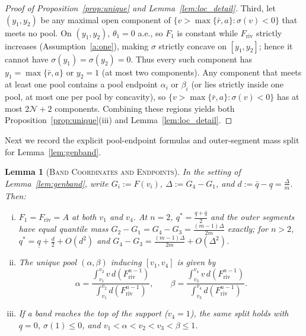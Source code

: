 \documentclass[12pt]{article}
\theoremstyle{mystyle}
\newtheorem{lemma}{Lemma}
\theoremstyle{mystyle2}
\newcommand{\1}{\mathbf{1}}
\begin{document}
\begin{proof}[Proof of Proposition~\ref{prop:unique} and Lemma~\ref{lem:loc_detail}]
Third, let $(y_1,y_2)$ be any maximal open component of $\{v>\max\{\bar r,a\}:\sigma(v)<0\}$ that meets no pool. On $(y_1,y_2)$, $\theta_1=0$ a.e., so $F_1$ is constant while $F_{\mathrm{riv}}$ strictly increases (Assumption~\ref{a:one}), making $\sigma$ strictly concave on $[y_1,y_2]$; hence it cannot have $\sigma(y_1)=\sigma(y_2)=0$. Thus every such component has $y_1=\max\{\bar r,a\}$ or $y_2=1$ (at most two components). Any component that meets at least one pool contains a pool endpoint $\alpha_i$ or $\beta_i$ (or lies strictly inside one pool, at most one per pool by concavity), so $\{v>\max\{\bar r,a\}:\sigma(v)<0\}$ has at most $2\mathcal N+2$ components. Combining these regions yields both Proposition~\ref{prop:unique}(iii) and Lemma~\ref{lem:loc_detail}.
\end{proof}

Next we record the explicit pool-endpoint formulas and outer-segment mass split for Lemma~\ref{lem:genband}.

\begin{lemma}[\textsc{Band Coordinates and Endpoints}]\label{lem:band_detail}
In the setting of Lemma~\ref{lem:genband}, write $G_i:=F(v_i)$, $\Delta:=G_4-G_1$, and $d:=\bar q-\underline q=\frac{\Delta}{m}$. Then:
\begin{enumerate}[(i)]
\item $F_1=F_{\mathrm{riv}}=A$ at both $v_1$ and $v_4$. At $n=2$, $q^*=\frac{\underline q+\bar q}{2}$ and the outer segments have equal quantile mass $G_2-G_1=G_4-G_3=\frac{(m-1)\Delta}{2m}$ exactly; for $n>2$, $q^*=\underline q+\frac{d}{2}+O(d^2)$ and $G_4-G_3=\frac{(m-1)\Delta}{2m}+O(\Delta^2)$.
\item The unique pool $(\alpha,\beta)$ inducing $[v_1,v_4]$ is given by
\begin{equation}\label{eq:poolends}
\alpha = \frac{\int_{v_1}^{v_2} v\,d(F_{\mathrm{riv}}^{n-1})}{\int_{v_1}^{v_2} d(F_{\mathrm{riv}}^{n-1})}, \qquad
\beta = \frac{\int_{v_3}^{v_4} v\,d(F_{\mathrm{riv}}^{n-1})}{\int_{v_3}^{v_4} d(F_{\mathrm{riv}}^{n-1})}.
\end{equation}
\item If a band reaches the top of the support ($v_4=1$), the same split holds with $\underline q=0$, $\sigma(1)\le 0$, and $v_1<\alpha<v_2<v_3<\beta\le 1$.
\end{enumerate}
\end{lemma}
\end{document}
